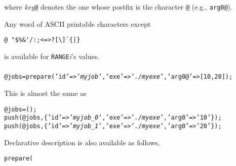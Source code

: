 \documentclass[a4paper,10pt]{report}
\begin{document}
\subsubsection{\format}

\vspace{\baselineskip}
\noindent
where \textit{key}\texttt{@} denotes the one whose postfix is the
character \texttt{@} (e.g., \texttt{arg0@}).

Any word of ASCII printable characters except
\begin{center}
\verb*+@ "$%&'/:;<=>?[\]`{|}+        %
\end{center}
is available for \texttt{RANGE}\textit{i}'s values.

\subsubsection{\example}

\begin{boxnote}
\begin{alltt}
@jobs = prepare('id' => '\textit{myjob}', 'exe' => '\textit{./myexe}', 'arg0@' => [10,20]);
\end{alltt}
\end{boxnote}
\vspace{\baselineskip}

This is almost the same as
\begin{boxnote}
\begin{alltt}
@jobs = ();
push(@jobs, \{'id' => '\textit{myjob_0}', 'exe' => '\textit{./myexe}', 'arg0' => '10'\});
push(@jobs, \{'id' => '\textit{myjob_1}', 'exe' => '\textit{./myexe}', 'arg0' => '20'\});
\end{alltt}
\end{boxnote}
\vspace{\baselineskip}

Declarative description is also available as follows,
\begin{boxnote}
\begin{alltt}
%template = ('id' => '\textit{myjob}', 'exe' => '\textit{./myexe}', 'arg0@' => [10,20]);
prepare(%template);
\end{alltt}
\end{boxnote}
\vspace{\baselineskip}
\end{document}
